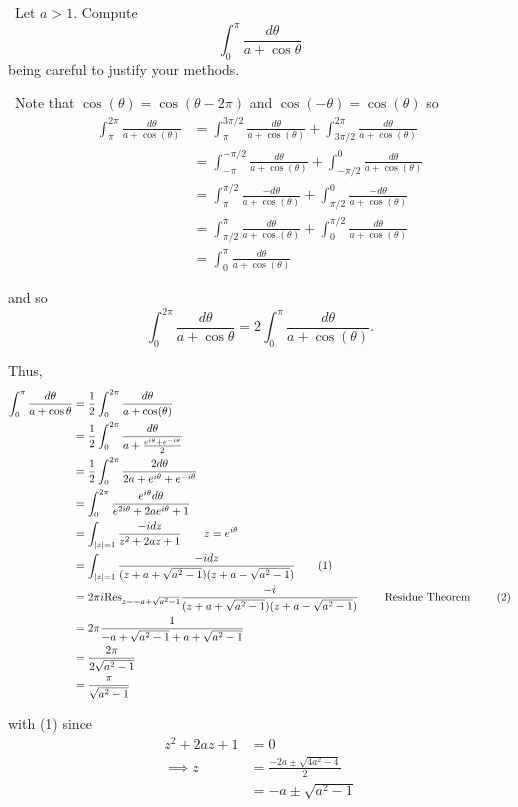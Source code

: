 \documentclass[12pt]{Qual}
\begin{document}
\begin{problem} $\,$
Let $a>1$. Compute $$\int_0^\pi\frac{d\theta}{a+\cos\theta}$$ being careful to justify your methods.
\end{problem}


\begin{solution}$\,$
Note that $\cos(\theta)=\cos(\theta-2\pi)$ and $\cos(-\theta)=\cos(\theta)$ so \begin{align*}
   \int_\pi^{2\pi}\frac{d\theta}{a+\cos(\theta)}&=\int_\pi^{3\pi/2}\frac{d\theta}{a+\cos(\theta)}+\int_{3\pi/2}^{2\pi}\frac{d\theta}{a+\cos(\theta)}\\
   &=\int_{-\pi}^{-\pi/2}\frac{d\theta}{a+\cos(\theta)}+\int_{-\pi/2}^0\frac{d\theta}{a+\cos(\theta)}\\
   &=\int_{\pi}^{\pi/2}\frac{-d\theta}{a+\cos(\theta)}+\int_{\pi/2}^0\frac{-d\theta}{a+\cos(\theta)}\\
   &=\int_{\pi/2}^{\pi}\frac{d\theta}{a+\cos(\theta)}+\int_0^{\pi/2}\frac{d\theta}{a+\cos(\theta)}\\
   &=\int_0^{\pi}\frac{d\theta}{a+\cos(\theta)}
\end{align*}

and so $$\int_0^{2\pi}\frac{d\theta}{a+\cos\theta}=2\int_0^\pi\frac{d\theta}{a+\cos(\theta)}.$$

Thus, \begin{align*}
    \int_0^\pi\frac{d\theta}{a+\cos\theta}&=\frac{1}{2}\int_0^{2\pi}\frac{d\theta}{a+\cos(\theta)}\\
    &=\frac{1}{2}\int_0^{2\pi}\frac{d\theta}{a+\frac{e^{i\theta}+e^{-i\theta}}{2}}\\
    &=\frac{1}{2}\int_0^{2\pi}\frac{2d\theta}{2a+e^{i\theta}+e^{-i\theta}}\\
    &=\int_0^{2\pi}\frac{e^{i\theta}d\theta}{e^{2i\theta}+2ae^{i\theta}+1}\\
    &=\int_{|z|=1}\frac{-idz}{z^2+2az+1}\qquad z=e^{i\theta}\\
    &=\int_{|z|=1}\frac{-idz}{(z+a+\sqrt{a^2-1})(z+a-\sqrt{a^2-1})}\tag{1}\\
    &=2\pi i\text{Res}_{z=-a+\sqrt{a^2-1}}\frac{-i}{(z+a+\sqrt{a^2-1})(z+a-\sqrt{a^2-1})}\qquad\text{ Residue Theorem }\tag{2}\\
    &=2\pi\frac{1}{-a+\sqrt{a^2-1}+a+\sqrt{a^2-1}}\\
    &=\frac{2\pi}{2\sqrt{a^2-1}}\\
    &=\frac{\pi}{\sqrt{a^2-1}}
\end{align*}

with (1) since \begin{align*}
    z^2+2az+1&=0\\
    \implies z&=\frac{-2a\pm\sqrt{4a^2-4}}{2}\\
    &=-a\pm\sqrt{a^2-1}
\end{align*}


\end{solution}
\end{document}
